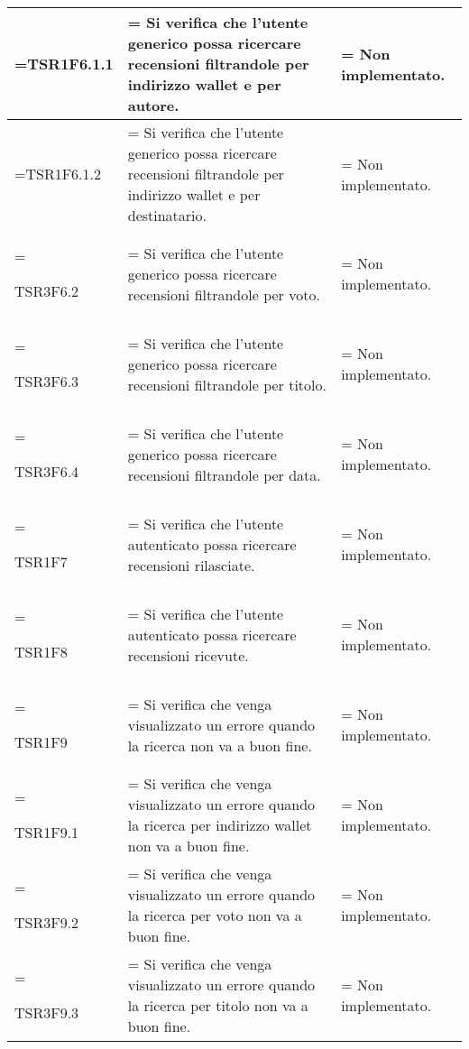 \begin{xltabular}{\textwidth} {
            >{\hsize\linewidth=\hsize}X
            >{\hsize\linewidth=\hsize}X
            >{\hsize\linewidth=\hsize}X
        }
        TSR1F6.1.1&
        Si verifica che l'utente generico possa ricercare recensioni filtrandole per indirizzo wallet e per autore.&
        Non implementato.
        \\ \hline
        
        TSR1F6.1.2&
        Si verifica che l'utente generico possa ricercare recensioni filtrandole per indirizzo wallet e per destinatario.&
        Non implementato.
        \\ \hline

        TSR3F6.2&
        Si verifica che l'utente generico possa ricercare recensioni filtrandole per voto.&
        Non implementato.
        \\ \hline
        
        TSR3F6.3&
        Si verifica che l'utente generico possa ricercare recensioni filtrandole per titolo.&
        Non implementato.
        \\ \hline

        TSR3F6.4&
        Si verifica che l'utente generico possa ricercare recensioni filtrandole per data.&
        Non implementato.
        \\ \hline

        TSR1F7&
        Si verifica che l'utente autenticato possa ricercare recensioni rilasciate. &
        Non implementato.
        \\ \hline

        TSR1F8&
        Si verifica che l'utente autenticato possa ricercare recensioni ricevute. &
        Non implementato.
        \\ \hline
        
        TSR1F9&
        Si verifica che venga visualizzato un errore quando la ricerca non va a buon fine. &
        Non implementato.
        \\ \hline

        TSR1F9.1&
        Si verifica che venga visualizzato un errore quando la ricerca per indirizzo wallet non va a buon fine. &
        Non implementato.
        \\ \hline
        
        TSR3F9.2&
        Si verifica che venga visualizzato un errore quando la ricerca per voto non va a buon fine. &
        Non implementato.
        \\ \hline
        
        TSR3F9.3&
        Si verifica che venga visualizzato un errore quando la ricerca per titolo non va a buon fine. &
        Non implementato.
        \\ \hline


\end{xltabular}
